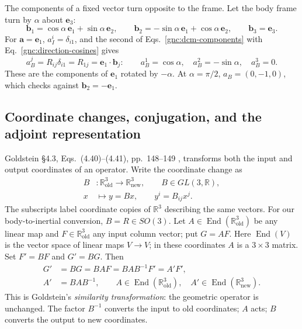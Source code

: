 The components of a fixed vector turn opposite to the frame. Let the body
frame turn by $\alpha$ about $\mathbf e_3$:
\[
 \mathbf b_1=\cos\alpha\,\mathbf e_1+\sin\alpha\,\mathbf e_2,\qquad
 \mathbf b_2=-\sin\alpha\,\mathbf e_1+\cos\alpha\,\mathbf e_2,\qquad
 \mathbf b_3=\mathbf e_3 .
\]
For $\mathbf a=\mathbf e_1$, $a_I^i=\delta_{i1}$, and the second of
Eqs.~\eqref{gnc:dcm-components} with Eq.~\eqref{gnc:direction-cosines}
gives
\[
 a_B^j=R_{ij}\delta_{i1}=R_{1j}=\mathbf e_1\cdot\mathbf b_j:\qquad
 a_B^1=\cos\alpha,\quad a_B^2=-\sin\alpha,\quad a_B^3=0 .
\]
These are the components of $\mathbf e_1$ rotated by $-\alpha$. At
$\alpha=\pi/2$, $a_B=(0,-1,0)$, which checks against
$\mathbf b_2=-\mathbf e_1$.

\subsection{Coordinate changes, conjugation, and the adjoint representation}
\label{gnc:sec:conjugation}
Goldstein \S4.3, Eqs.~(4.40)--(4.41), pp.~148--149
\cite{dgdt:GPS2001}, transforms both the input and output coordinates of
an operator. Write the coordinate change as
\begin{equation}\label{gnc:coordinate-change}
 \begin{aligned}
 B&\colon\mathbb R^3_{\mathrm{old}}\longrightarrow
          \mathbb R^3_{\mathrm{new}},\qquad B\in GL(3,\mathbb R),\\
 x&\longmapsto y=Bx,\qquad y^i=B_{ij}x^j .
 \end{aligned}
\end{equation}
The subscripts label coordinate copies of $\mathbb R^3$ describing the
same vectors. For our body-to-inertial conversion, $B=R\in SO(3)$.
Let $A\in\operatorname{End}(\mathbb R^3_{\mathrm{old}})$ be any linear
map and $F\in\mathbb R^3_{\mathrm{old}}$ any input column vector; put
$G=AF$. Here $\operatorname{End}(V)$ is the vector space of linear maps
$V\to V$; in these coordinates $A$ is a $3\times3$ matrix.
Set $F'=BF$ and $G'=BG$. Then
\begin{equation}\label{gnc:operator-similarity}
 \begin{aligned}
 G'&=BG=BAF=BAB^{-1}F'=A'F',\\
 A'&=BAB^{-1},\qquad A\in\operatorname{End}(\mathbb R^3_{\mathrm{old}}),
 \quad A'\in\operatorname{End}(\mathbb R^3_{\mathrm{new}}).
 \end{aligned}
\end{equation}
This is Goldstein's \emph{similarity transformation}: the geometric
operator is unchanged. The factor $B^{-1}$ converts the input to old
coordinates; $A$ acts; $B$ converts the output to new coordinates.

